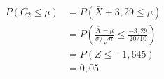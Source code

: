 \begin{questions}
\begin{parts}
    \begin{solution}
        \begin{align*}
            P(C_2\leq \mu)&=P(\bar{X}+3{,}29\leq \mu)\\
            &= P\left(\frac{\bar{X}-\mu}{\sigma/\sqrt{n}}\leq \frac{-3{,}29}{20/10}\right)\\
            &= P(Z\leq -1{,}645)\\
            &= 0{,}05
        \end{align*}
    \end{solution}


\end{parts}
\end{questions}

 
